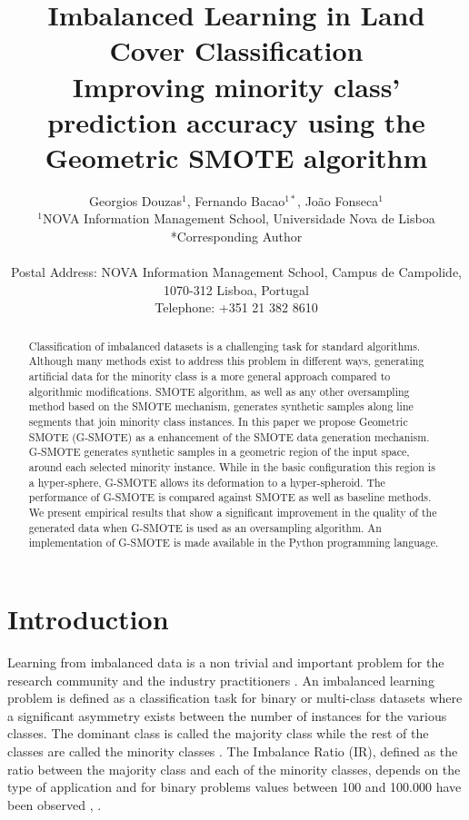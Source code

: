 \documentclass[parskip=full]{scrartcl}
\title{Imbalanced Learning in Land Cover Classification  \\ \LARGE{Improving minority class' prediction accuracy using the Geometric SMOTE algorithm}}
\author{
	Georgios Douzas\(^{1}\), Fernando Bacao\(^{1*}\), João Fonseca\(^{1}\)
	\\
	\small{\(^{1}\)NOVA Information Management School, Universidade Nova de Lisboa}
	\\
	\small{*Corresponding Author}
	\\
	\\
	\small{Postal Address: NOVA Information Management School, Campus de Campolide, 1070-312 Lisboa, Portugal}
	\\
	\small{Telephone: +351 21 382 8610}
}
\date{}
\begin{document}
\maketitle

\begin{abstract}
Classification of imbalanced datasets is a challenging task for standard
algorithms. Although many methods exist to address this problem in different
ways, generating artificial data for the minority class is a more general
approach compared to algorithmic modifications. SMOTE algorithm, as well as any
other oversampling method based on the SMOTE mechanism, generates synthetic
samples along line segments that join minority class instances. In this paper we
propose Geometric SMOTE (G-SMOTE) as a enhancement of the SMOTE data generation
mechanism. G-SMOTE generates synthetic samples in a geometric region of the
input space, around each selected minority instance. While in the basic
configuration this region is a hyper-sphere, G-SMOTE allows its deformation to a
hyper-spheroid. The performance of G-SMOTE is compared against SMOTE as well as
baseline methods. We present empirical results that show a significant
improvement in the quality of the generated data when G-SMOTE is used as an
oversampling algorithm. An implementation of G-SMOTE is made available in the
Python programming language.
\end{abstract}

\section{Introduction}
Learning from imbalanced data is a non trivial and important problem for the
research community and the industry practitioners \cite{Chawla2003}. An
imbalanced learning problem is defined as a classification task for binary or
multi-class datasets where a significant asymmetry exists between the number of
instances for the various classes. The dominant class is called the majority
class while the rest of the classes are called the minority classes
\cite{Chawla2003}. The Imbalance Ratio (IR), defined as the ratio between the
majority class and each of the minority classes, depends on the type of
application and for binary problems values between 100 and 100.000 have been
observed \cite{Chawla2002}, \cite{Barua2014}.
\end{document}
